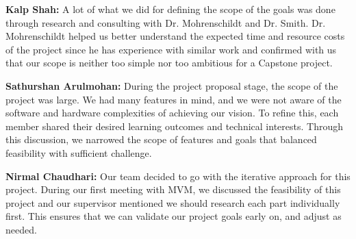 \documentclass{article}
\begin{document}
\begin{enumerate}
    \textbf{Kalp Shah:} A lot of what we did for defining the scope of the goals
    was done through research and consulting with Dr. Mohrenschildt and Dr.
    Smith. Dr. Mohrenschildt helped us better understand the expected time and
    resource costs of the project since he has experience with similar work and
    confirmed with us that our scope is neither too simple nor too ambitious for
    a Capstone project.

    \textbf{Sathurshan Arulmohan:} During the project proposal stage, the scope
    of the project was large. We had many features in mind, and we were not
    aware of the software and hardware complexities of achieving our vision. To
    refine this, each member shared their desired learning outcomes and
    technical interests. Through this discussion, we narrowed the scope of
    features and goals that balanced feasibility with sufficient challenge.

    \textbf{Nirmal Chaudhari:} Our team decided to go with the iterative
    approach for this project. During our first meeting with MVM, we discussed
    the feasibility of this project and our supervisor mentioned we should
    research each part individually first. This ensures that we can validate our
    project goals early on, and adjust as needed. 

\end{enumerate}  



\end{document}
